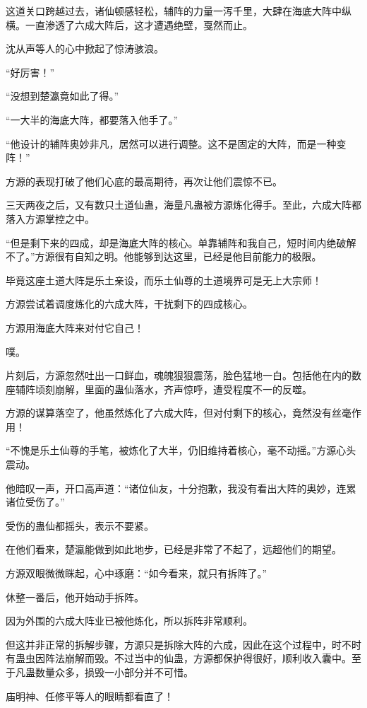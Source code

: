 \begin{this_body}
这道关口跨越过去，诸仙顿感轻松，辅阵的力量一泻千里，大肆在海底大阵中纵横。一直渗透了六成大阵后，这才遭遇绝壁，戛然而止。

沈从声等人的心中掀起了惊涛骇浪。

“好厉害！”

“没想到楚瀛竟如此了得。”

“一大半的海底大阵，都要落入他手了。”

“他设计的辅阵奥妙非凡，居然可以进行调整。这不是固定的大阵，而是一种变阵！”

方源的表现打破了他们心底的最高期待，再次让他们震惊不已。

三天两夜之后，又有数只土道仙蛊，海量凡蛊被方源炼化得手。至此，六成大阵都落入方源掌控之中。

“但是剩下来的四成，却是海底大阵的核心。单靠辅阵和我自己，短时间内绝破解不了。”方源很有自知之明。他能够到达这里，已经是他目前能力的极限。

毕竟这座土道大阵是乐土亲设，而乐土仙尊的土道境界可是无上大宗师！

方源尝试着调度炼化的六成大阵，干扰剩下的四成核心。

方源用海底大阵来对付它自己！

噗。

片刻后，方源忽然吐出一口鲜血，魂魄狠狠震荡，脸色猛地一白。包括他在内的数座辅阵顷刻崩解，里面的蛊仙落水，齐声惊呼，遭受程度不一的反噬。

方源的谋算落空了，他虽然炼化了六成大阵，但对付剩下的核心，竟然没有丝毫作用！

“不愧是乐土仙尊的手笔，被炼化了大半，仍旧维持着核心，毫不动摇。”方源心头震动。

他暗叹一声，开口高声道：“诸位仙友，十分抱歉，我没有看出大阵的奥妙，连累诸位受伤了。”

受伤的蛊仙都摇头，表示不要紧。

在他们看来，楚瀛能做到如此地步，已经是非常了不起了，远超他们的期望。

方源双眼微微眯起，心中琢磨：“如今看来，就只有拆阵了。”

休整一番后，他开始动手拆阵。

因为外围的六成大阵业已被他炼化，所以拆阵非常顺利。

但这并非正常的拆解步骤，方源只是拆除大阵的六成，因此在这个过程中，时不时有蛊虫因阵法崩解而毁。不过当中的仙蛊，方源都保护得很好，顺利收入囊中。至于凡蛊数量众多，损毁一小部分并不可惜。

庙明神、任修平等人的眼睛都看直了！


\end{this_body}
